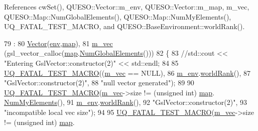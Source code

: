 References cw\-Set(), Q\-U\-E\-S\-O\-::\-Vector\-::m\-\_\-env, Q\-U\-E\-S\-O\-::\-Vector\-::m\-\_\-map, m\-\_\-vec, Q\-U\-E\-S\-O\-::\-Map\-::\-Num\-Global\-Elements(), Q\-U\-E\-S\-O\-::\-Map\-::\-Num\-My\-Elements(), U\-Q\-\_\-\-F\-A\-T\-A\-L\-\_\-\-T\-E\-S\-T\-\_\-\-M\-A\-C\-R\-O, and Q\-U\-E\-S\-O\-::\-Base\-Environment\-::world\-Rank().


\begin{DoxyCode}
79   :
80   \hyperlink{class_q_u_e_s_o_1_1_vector_aff103391923777d30d67f3d89706278b}{Vector}(\hyperlink{class_q_u_e_s_o_1_1_vector_a2e2952dab0554fedd8dc9a2543715745}{env},\hyperlink{class_q_u_e_s_o_1_1_vector_a0cbedc1f6e24c0ad3b688d201fd649a4}{map}),
81   \hyperlink{class_q_u_e_s_o_1_1_gsl_vector_a503dd126017b7ac587ff511e8d0d833b}{m\_vec}        (gsl\_vector\_calloc(\hyperlink{class_q_u_e_s_o_1_1_vector_a0cbedc1f6e24c0ad3b688d201fd649a4}{map}.\hyperlink{class_q_u_e_s_o_1_1_map_ac67907266dcd7108ffe5a0cbef908781}{NumGlobalElements}()))
82 \{
83   \textcolor{comment}{//std::cout << "Entering GslVector::constructor(2)" << std::endl;}
84 
85   \hyperlink{_defines_8h_a56d63d18d0a6d45757de47fcc06f574d}{UQ\_FATAL\_TEST\_MACRO}((\hyperlink{class_q_u_e_s_o_1_1_gsl_vector_a503dd126017b7ac587ff511e8d0d833b}{m\_vec} == NULL),
86                       \hyperlink{class_q_u_e_s_o_1_1_vector_ae7615172bb1e54339151d3f3d71a0344}{m\_env}.\hyperlink{class_q_u_e_s_o_1_1_base_environment_a78b57112bbd0e6dd0e8afec00b40ffa7}{worldRank}(),
87                       \textcolor{stringliteral}{"GslVector::constructor(2)"},
88                       \textcolor{stringliteral}{"null vector generated"});
89 
90   \hyperlink{_defines_8h_a56d63d18d0a6d45757de47fcc06f574d}{UQ\_FATAL\_TEST\_MACRO}(\hyperlink{class_q_u_e_s_o_1_1_gsl_vector_a503dd126017b7ac587ff511e8d0d833b}{m\_vec}->size != (\textcolor{keywordtype}{unsigned} \textcolor{keywordtype}{int}) \hyperlink{class_q_u_e_s_o_1_1_vector_a0cbedc1f6e24c0ad3b688d201fd649a4}{map}.
      \hyperlink{class_q_u_e_s_o_1_1_map_a6407f6d6a6df8a0a40923c8dc524b021}{NumMyElements}(),
91                       \hyperlink{class_q_u_e_s_o_1_1_vector_ae7615172bb1e54339151d3f3d71a0344}{m\_env}.\hyperlink{class_q_u_e_s_o_1_1_base_environment_a78b57112bbd0e6dd0e8afec00b40ffa7}{worldRank}(),
92                       \textcolor{stringliteral}{"GslVector::constructor(2)"},
93                       \textcolor{stringliteral}{"incompatible local vec size"});
94 
95   \hyperlink{_defines_8h_a56d63d18d0a6d45757de47fcc06f574d}{UQ\_FATAL\_TEST\_MACRO}(\hyperlink{class_q_u_e_s_o_1_1_gsl_vector_a503dd126017b7ac587ff511e8d0d833b}{m\_vec}->size != (\textcolor{keywordtype}{unsigned} \textcolor{keywordtype}{int}) \hyperlink{class_q_u_e_s_o_1_1_vector_a0cbedc1f6e24c0ad3b688d201fd649a4}{map}.

\end{DoxyCode}
